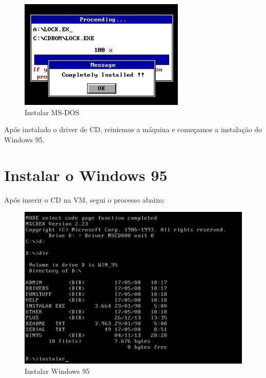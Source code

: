 \documentclass{report}
\begin{document}
\begin{figure}
\centering
\includegraphics[width=\textwidth]{Screenshot_25.png}
\caption{Instalar MS-DOS}
\label{fig:25}
\end{figure}

\newpage
Após instalado o driver de CD, reiniemos a máquina e começamos a instalação do Windows 95.

\chapter{Instalar o Windows 95}

Após inserir o CD na VM, segui o processo abaixo:

\begin{figure}
\centering
\includegraphics[width=\textwidth]{Screenshot_26.png}
\caption{Instalar Windows 95}
\label{fig:26}
\end{figure}
\end{document}
